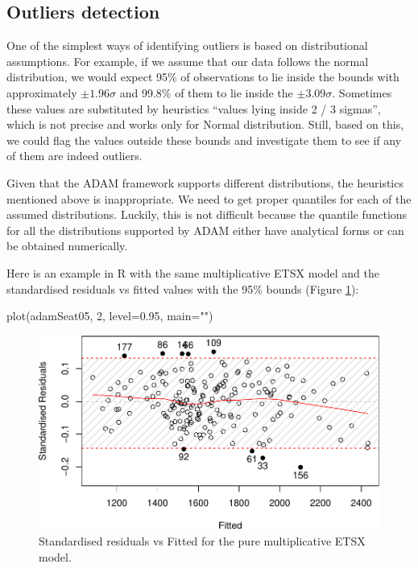 \documentclass[
]{book}
\newenvironment{Shaded}{\begin{snugshade}}{\end{snugshade}}
\newcommand{\AttributeTok}[1]{\textcolor[rgb]{0.77,0.63,0.00}{#1}}
\newcommand{\DecValTok}[1]{\textcolor[rgb]{0.00,0.00,0.81}{#1}}
\newcommand{\FloatTok}[1]{\textcolor[rgb]{0.00,0.00,0.81}{#1}}
\newcommand{\FunctionTok}[1]{\textcolor[rgb]{0.00,0.00,0.00}{#1}}
\newcommand{\NormalTok}[1]{#1}
\newcommand{\StringTok}[1]{\textcolor[rgb]{0.31,0.60,0.02}{#1}}
\theoremstyle{definition}
\theoremstyle{definition}
\theoremstyle{definition}
\theoremstyle{definition}
\theoremstyle{remark}
\begin{document}
\hypertarget{outliers-detection}{%
\subsection{Outliers detection}\label{outliers-detection}}

One of the simplest ways of identifying outliers is based on distributional assumptions. For example, if we assume that our data follows the normal distribution, we would expect 95\% of observations to lie inside the bounds with approximately \(\pm 1.96\sigma\) and 99.8\% of them to lie inside the \(\pm 3.09 \sigma\). Sometimes these values are substituted by heuristics ``values lying inside 2 / 3 sigmas'', which is not precise and works only for Normal distribution. Still, based on this, we could flag the values outside these bounds and investigate them to see if any of them are indeed outliers.

Given that the ADAM framework supports different distributions, the heuristics mentioned above is inappropriate. We need to get proper quantiles for each of the assumed distributions. Luckily, this is not difficult because the quantile functions for all the distributions supported by ADAM either have analytical forms or can be obtained numerically.

Here is an example in R with the same multiplicative ETSX model and the standardised residuals vs fitted values with the 95\% bounds (Figure \ref{fig:adamSeat05ResidFitted}):

\begin{Shaded}
\begin{Highlighting}[]
\FunctionTok{plot}\NormalTok{(adamSeat05, }\DecValTok{2}\NormalTok{, }\AttributeTok{level=}\FloatTok{0.95}\NormalTok{, }\AttributeTok{main=}\StringTok{""}\NormalTok{)}
\end{Highlighting}
\end{Shaded}

\begin{figure}
\centering
\includegraphics{Svetunkov--2022----ADAM_files/figure-latex/adamSeat05ResidFitted-1.pdf}
\caption{\label{fig:adamSeat05ResidFitted}Standardised residuals vs Fitted for the pure multiplicative ETSX model.}
\end{figure}
\end{document}
